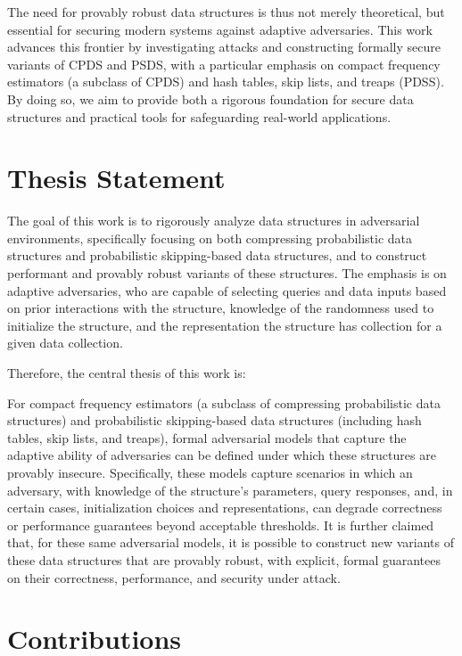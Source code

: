 The need for provably robust data structures is thus not merely theoretical, but essential for securing modern systems against adaptive adversaries. This work advances this frontier by investigating attacks and constructing formally secure variants of CPDS and PSDS, with a particular emphasis on compact frequency estimators (a subclass of CPDS) and hash tables, skip lists, and treaps (PDSS). By doing so, we aim to provide both a rigorous foundation for secure data structures and practical tools for safeguarding real-world applications.

\section{Thesis Statement}

The goal of this work is to rigorously analyze data structures in adversarial environments, specifically focusing on both compressing probabilistic data structures and probabilistic skipping-based data structures, and to construct performant and provably robust variants of these structures. The emphasis is on adaptive adversaries, who are capable of selecting queries and data inputs based on prior interactions with the structure, knowledge of the randomness used to initialize the structure, and the representation the structure has collection for a given data collection.

Therefore, the central thesis of this work is:

For compact frequency estimators (a subclass of compressing probabilistic data structures) and probabilistic skipping-based data structures (including hash tables, skip lists, and treaps), formal adversarial models that capture the adaptive ability of adversaries can be defined under which these structures are provably insecure. Specifically, these models capture scenarios in which an adversary, with knowledge of the structure’s parameters, query responses, and, in certain cases, initialization choices and representations, can degrade correctness or performance guarantees beyond acceptable thresholds. It is further claimed that, for these same adversarial models, it is possible to construct new variants of these data structures that are provably robust, with explicit, formal guarantees on their correctness, performance, and security under attack.

\section{Contributions}


